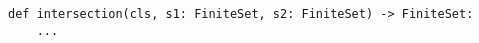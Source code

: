 \begin{verbatim}
def intersection(cls, s1: FiniteSet, s2: FiniteSet) -> FiniteSet:
    ...
\end{verbatim}